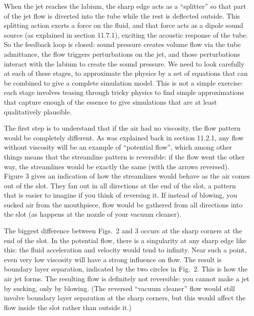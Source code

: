  When the jet reaches the labium, the sharp edge acts as a ``splitter'' so 
  that part of the jet flow is diverted into the tube while the rest is 
  deflected outside. This splitting action exerts a force on the fluid, and 
  that force acts as a dipole sound source (as explained in section 11.7.1), 
  exciting the acoustic response of the tube. So the feedback loop is closed: 
  sound pressure creates volume flow via the tube admittance, the flow triggers 
  perturbations on the jet, and those perturbations interact with the labium to 
  create the sound pressure. We need to look carefully at each of these stages, 
  to approximate the physics by a set of equations that can be combined to give 
  a complete simulation model. This is not a simple exercise: each stage 
  involves teasing through tricky physics to find simple approximations that 
  capture enough of the essence to give simulations that are at least 
  qualitatively plausible. 

  The first step is to understand that if the air had no viscosity, the flow 
  pattern would be completely different. As was explained back in section 
  11.2.1, any flow without viscosity will be an example of ``potential flow'', 
  which among other things means that the streamline pattern is reversible: if 
  the flow went the other way, the streamlines would be exactly the same (with 
  the arrows reversed). Figure 3 gives an indication of how the streamlines 
  would behave as the air comes out of the slot. They fan out in all directions 
  at the end of the slot, a pattern that is easier to imagine if you think of 
  reversing it. If instead of blowing, you sucked air from the mouthpiece, flow 
  would be gathered from all directions into the slot (as happens at the nozzle 
  of your vacuum cleaner). 


  The biggest difference between Figs.\ 2 and 3 occurs at the sharp corners at 
  the end of the slot. In the potential flow, there is a singularity at any 
  sharp edge like this: the fluid acceleration and velocity would tend to 
  infinity. Near such a point, even very low viscosity will have a strong 
  influence on flow. The result is boundary layer separation, indicated by the 
  two circles in Fig.\ 2. This is how the air jet forms. The resulting flow is 
  definitely not reversible: you cannot make a jet by sucking, only by blowing. 
  (The reversed ``vacuum cleaner'' flow would still involve boundary layer 
  separation at the sharp corners, but this would affect the flow inside the 
  slot rather than outside it.) 

